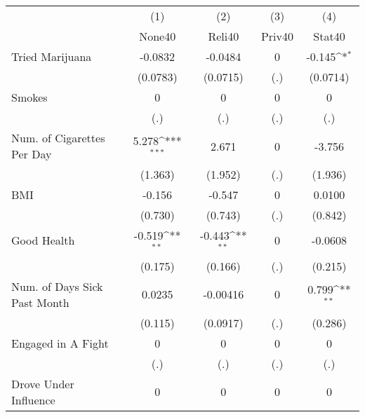 {
\def\sym#1{\ifmmode^{#1}\else\(^{#1}\)\fi}
\begin{tabular}{l*{4}{c}}
\hline\hline
            &\multicolumn{1}{c}{(1)}&\multicolumn{1}{c}{(2)}&\multicolumn{1}{c}{(3)}&\multicolumn{1}{c}{(4)}\\
            &\multicolumn{1}{c}{None40}&\multicolumn{1}{c}{Reli40}&\multicolumn{1}{c}{Priv40}&\multicolumn{1}{c}{Stat40}\\
\hline
Tried Marijuana&     -0.0832         &     -0.0484         &           0         &      -0.145\sym{*}  \\
            &    (0.0783)         &    (0.0715)         &         (.)         &    (0.0714)         \\
[1em]
Smokes      &           0         &           0         &           0         &           0         \\
            &         (.)         &         (.)         &         (.)         &         (.)         \\
[1em]
Num. of Cigarettes Per Day&       5.278\sym{***}&       2.671         &           0         &      -3.756         \\
            &     (1.363)         &     (1.952)         &         (.)         &     (1.936)         \\
[1em]
BMI         &      -0.156         &      -0.547         &           0         &      0.0100         \\
            &     (0.730)         &     (0.743)         &         (.)         &     (0.842)         \\
[1em]
Good Health &      -0.519\sym{**} &      -0.443\sym{**} &           0         &     -0.0608         \\
            &     (0.175)         &     (0.166)         &         (.)         &     (0.215)         \\
[1em]
Num. of Days Sick Past Month&      0.0235         &    -0.00416         &           0         &       0.799\sym{**} \\
            &     (0.115)         &    (0.0917)         &         (.)         &     (0.286)         \\
[1em]
Engaged in A Fight&           0         &           0         &           0         &           0         \\
            &         (.)         &         (.)         &         (.)         &         (.)         \\
[1em]
Drove Under Influence&           0         &           0         &           0         &           0         \\

\end{tabular}}
